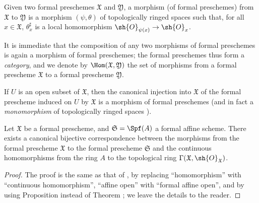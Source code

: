 \begin{definition}[10.4.5]
\label{I.10.4.5}
Given two formal preschemes $\mathfrak{X}$ and $\mathfrak{Y}$, a morphism (of formal preschemes) from $\mathfrak{X}$ to $\mathfrak{Y}$ is a morphism $(\psi,\theta)$ of topologically ringed spaces such that, for all $x\in\mathfrak{X}$, $\theta_x^\sharp$ is a local homomorphism $\sh{O}_{\psi(x)}\to\sh{O}_x$.
\end{definition}

It is immediate that the composition of any two morphisms of formal preschemes is again a morphism of formal preschemes; the formal preschemes thus form a \emph{category}, and we denote by $\Hom(\mathfrak{X},\mathfrak{Y})$ the set of morphisms from a formal prescheme $\mathfrak{X}$ to a formal prescheme $\mathfrak{Y}$.

If $U$ is an open subset of $\mathfrak{X}$, then the canonical injection into $\mathfrak{X}$ of the formal prescheme induced on $U$ by $\mathfrak{X}$ is a morphism of formal preschemes (and in fact a \emph{monomorphism} of topologically ringed spaces ).

\begin{proposition}[10.4.6]
\label{I.10.4.6}
Let $\mathfrak{X}$ be a formal prescheme, and $\mathfrak{S}=\Spf(A)$ a formal affine scheme.
There exists a canonical bijective correspondence between the morphisms from the formal prescheme $\mathfrak{X}$ to the formal prescheme $\mathfrak{S}$ and the continuous homomorphisms from the ring $A$ to the topological ring $\Gamma(\mathfrak{X},\sh{O}_\mathfrak{X})$.
\end{proposition}

\begin{proof}
The proof is the same as that of , by replacing ``homomorphism'' with ``continuous homomorphism'', ``affine open'' with ``formal affine open'', and by using Proposition  instead of Theorem ; we leave the details to the reader.
\end{proof}

